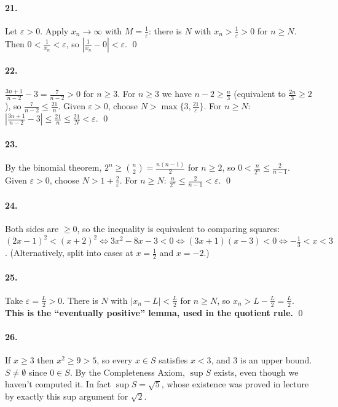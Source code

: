 \documentclass[11pt]{article}
\theoremstyle{definition}
\newcommand{\eps}{\varepsilon}
\newcommand{\key}[1]{\textcolor{red!70!black}{\textbf{#1}}}
\begin{document}
\paragraph{21.} Let $\eps>0$. Apply $x_n\to\infty$ with $M=\frac1\eps$:
there is $N$ with $x_n>\frac1\eps>0$ for $n\ge N$. Then
$0<\frac1{x_n}<\eps$, so $\left|\frac1{x_n}-0\right|<\eps$. \qed

\paragraph{22.} $\frac{3n+1}{n-2}-3=\frac{7}{n-2}>0$ for $n\ge3$. For
$n\ge3$ we have $n-2\ge\frac n3$ (equivalent to $\frac{2n}{3}\ge2$), so
$\frac7{n-2}\le\frac{21}n$. Given $\eps>0$, choose $N>\max\{3,\frac{21}\eps\}$.
For $n\ge N$: $\left|\frac{3n+1}{n-2}-3\right|\le\frac{21}n\le\frac{21}N<\eps$. \qed

\paragraph{23.} By the binomial theorem, $2^n\ge\binom n2=\frac{n(n-1)}2$ for
$n\ge2$, so $0<\frac n{2^n}\le\frac2{n-1}$. Given $\eps>0$, choose
$N>1+\frac2\eps$. For $n\ge N$: $\frac n{2^n}\le\frac2{n-1}<\eps$. \qed

\paragraph{24.} Both sides are $\ge0$, so the inequality is equivalent to
comparing squares:
$(2x-1)^2<(x+2)^2\iff3x^2-8x-3<0\iff(3x+1)(x-3)<0\iff-\frac13<x<3$.
(Alternatively, split into cases at $x=\frac12$ and $x=-2$.)

\paragraph{25.} Take $\eps=\frac L2>0$. There is $N$ with
$|x_n-L|<\frac L2$ for $n\ge N$, so
$x_n>L-\frac L2=\frac L2$. \key{This is the ``eventually positive'' lemma,
used in the quotient rule.} \qed

\paragraph{26.} If $x\ge3$ then $x^2\ge9>5$, so every $x\in S$ satisfies
$x<3$, and $3$ is an upper bound. $S\ne\emptyset$ since $0\in S$. By the
Completeness Axiom, $\sup S$ exists, even though we haven't computed it.
In fact $\sup S=\sqrt5$, whose existence was proved in lecture by exactly
this sup argument for $\sqrt2$.
\end{document}
